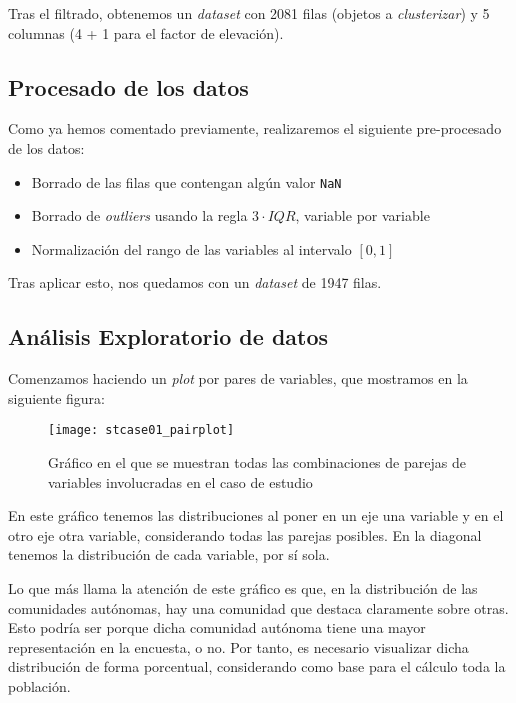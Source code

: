 \documentclass[11pt]{article}
\begin{document}
Tras el filtrado, obtenemos un \emph{dataset} con 2081 filas (objetos a \emph{clusterizar}) y 5 columnas (4 + 1 para el factor de elevación).

\subsection{Procesado de los datos}

Como ya hemos comentado previamente, realizaremos el siguiente pre-procesado de los datos:

\begin{itemize}
    \item Borrado de las filas que contengan algún valor \lstinline{NaN}
    \item Borrado de \emph{outliers} usando la regla $3 \cdot IQR$, variable por variable
    \item Normalización del rango de las variables al intervalo $[0, 1]$
\end{itemize}

Tras aplicar esto, nos quedamos con un \emph{dataset} de 1947 filas.

\subsection{Análisis Exploratorio de datos}

Comenzamos haciendo un \emph{plot} por pares de variables, que mostramos en la siguiente figura:

\begin{figure}[H]
    \centering

    \texttt{[image: stcase01\_pairplot]}
    \caption{Gráfico en el que se muestran todas las combinaciones de parejas de variables involucradas en el caso de estudio}
    \label{stcase01_pairplot:figura}
\end{figure}

En este gráfico tenemos las distribuciones al poner en un eje una variable y en el otro eje otra variable, considerando todas las parejas posibles. En la diagonal tenemos la distribución de cada variable, por sí sola.

Lo que más llama la atención de este gráfico es que, en la distribución de las comunidades autónomas, hay una comunidad que destaca claramente sobre otras. Esto podría ser porque dicha comunidad autónoma tiene una mayor representación en la encuesta, o no. Por tanto, es necesario visualizar dicha distribución de forma porcentual, considerando como base para el cálculo toda la población.
\end{document}
